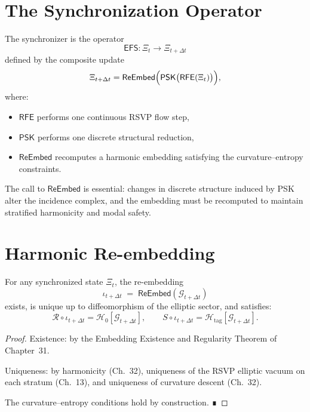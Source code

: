 \section{The Synchronization Operator}

\begin{definition}
The synchronizer is the operator
\[
\mathsf{EFS} : \Xi_t \longrightarrow \Xi_{t+\Delta t}
\]
defined by the composite update
\[
\Xi_{t+\Delta t}
=
\mathsf{ReEmbed}
\Bigl(
  \mathsf{PSK}
  \bigl(
    \mathsf{RFE}(\Xi_t)
  \bigr)
\Bigr),
\]
where:
\begin{itemize}
  \item $\mathsf{RFE}$ performs one continuous RSVP flow step,
  \item $\mathsf{PSK}$ performs one discrete structural reduction,
  \item $\mathsf{ReEmbed}$ recomputes a harmonic embedding satisfying the
        curvature--entropy constraints.
\end{itemize}
\end{definition}

The call to $\mathsf{ReEmbed}$ is essential: changes in discrete structure
induced by PSK alter the incidence complex, and the embedding must be
recomputed to maintain stratified harmonicity and modal safety.

\section{Harmonic Re-embedding}

\begin{theorem}
\label{thm:reembed}
For any synchronized state $\Xi_t$, the re-embedding
\[
\iota_{t+\Delta t} \;=\; \mathsf{ReEmbed}(\mathcal{G}_{t+\Delta t})
\]
exists, is unique up to diffeomorphism of the elliptic sector, and satisfies:
\[
\mathcal{R}\circ\iota_{t+\Delta t}
=
\mathcal{H}_0[\mathcal{G}_{t+\Delta t}],
\qquad
S\circ\iota_{t+\Delta t}
=
\mathcal{H}_{\mathrm{tag}}[\mathcal{G}_{t+\Delta t}].
\]
\end{theorem}

\begin{proof}
Existence: by the Embedding Existence and Regularity Theorem of
Chapter~31.

Uniqueness: by harmonicity (Ch.~32), uniqueness of the RSVP elliptic vacuum
on each stratum (Ch.~13), and uniqueness of curvature descent (Ch.~32).

The curvature--entropy conditions hold by construction. ∎
\end{proof}


